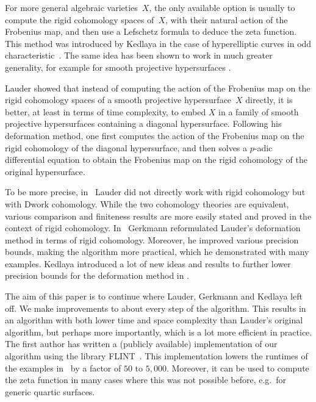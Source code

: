 \documentclass[a4paper,11pt]{article}
\numberwithin{equation}{section}
\theoremstyle{definition}
\begin{document}
For more general algebraic varieties~$X$, the only available option is 
usually to compute the rigid cohomology spaces of~$X$, with their natural 
action of the Frobenius map, and then use a Lefschetz formula to deduce the 
zeta function. This method was introduced by Kedlaya in the case of 
hyperelliptic curves in odd characteristic~\citep{Kedlaya2001}.  The same 
idea has been shown to work in much greater generality, for example for 
smooth projective hypersurfaces \citep{AbbottKedlayaRoe2006}. 

Lauder \citep{Lauder2004a,Lauder2004b} showed that instead of computing the 
action of the Frobenius map on the rigid cohomology spaces of a smooth 
projective hypersurface~$X$ directly, it is better, at least in terms of 
time complexity, to embed $X$ in a family of smooth projective hypersurfaces 
containing a diagonal hypersurface.  Following his deformation method, 
one first computes the action of the Frobenius map on the rigid cohomology 
of the diagonal hypersurface, and then solves a $p$-adic differential equation 
to obtain the Frobenius map on the rigid cohomology of the original 
hypersurface. 

To be more precise, in~\citep{Lauder2004a,Lauder2004b} Lauder did not directly 
work with rigid cohomology but with Dwork cohomology. While the two 
cohomology theories are equivalent, various comparison and finiteness results 
are more easily stated and proved in the context of rigid cohomology.  In~\citep{Gerkmann2007} 
Gerkmann reformulated Lauder's deformation method in terms of rigid 
cohomology.  Moreover, he improved various precision bounds, making 
the algorithm more practical, which he demonstrated with many examples. Kedlaya 
introduced a lot of new ideas and results to further lower precision bounds for 
the deformation method in \citep{Kedlaya2012}.

The aim of this paper is to continue where Lauder, Gerkmann and Kedlaya left 
off. We make improvements to about every step of the algorithm. This results 
in an algorithm with both lower time and space complexity than Lauder's 
original algorithm, but perhaps more importantly, which is a lot more efficient
in practice. The first author has written a (publicly available) 
implementation of our algorithm using the library FLINT~\citep{FLINT}. 
This implementation lowers the runtimes of the examples in~\citep{Gerkmann2007} 
by a factor of $50$ to $5,000$. Moreover, it can be used to compute the zeta 
function in many cases where this was not possible before, e.g.\ for generic 
quartic surfaces.
\end{document}
